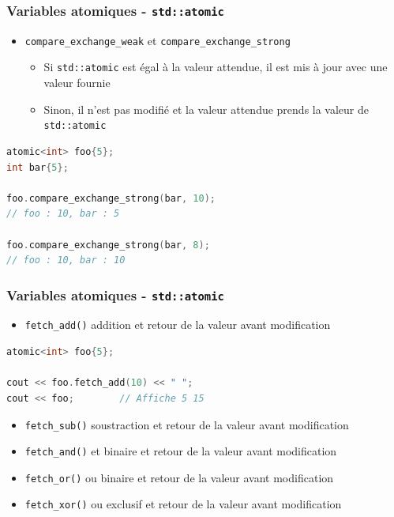 \documentclass[C++.tex]{subfiles}
\begin{document}
\begin{frame}[fragile]
	\frametitle{Variables atomiques - \lstinline|std::atomic|}
	\begin{itemize}
		\item \lstinline|compare_exchange_weak| et \lstinline|compare_exchange_strong| 


		\begin{itemize}
			\item Si \lstinline|std::atomic| est égal à la valeur attendue, il est mis à jour avec une valeur fournie
			\item Sinon, il n'est pas modifié et la valeur attendue prends la valeur de \lstinline|std::atomic|
		\end{itemize}
	\end{itemize}

	\begin{lstlisting}[language=C++]
atomic<int> foo{5};
int bar{5};

foo.compare_exchange_strong(bar, 10);
// foo : 10, bar : 5

foo.compare_exchange_strong(bar, 8);
// foo : 10, bar : 10\end{lstlisting}
\end{frame}

\begin{frame}[fragile]
	\frametitle{Variables atomiques - \lstinline|std::atomic|}
	\begin{itemize}
		\item \lstinline|fetch_add()| addition et retour de la valeur avant modification
	\end{itemize}

	\begin{lstlisting}[language=C++]
atomic<int> foo{5};

cout << foo.fetch_add(10) << " ";
cout << foo;        // Affiche 5 15\end{lstlisting}

	\begin{itemize}
		\item \lstinline|fetch_sub()| soustraction et retour de la valeur avant modification
		\item \lstinline|fetch_and()| \og et\fg{} binaire et retour de la valeur avant modification
		\item \lstinline|fetch_or()| \og ou\fg{} binaire et retour de la valeur avant modification
		\item \lstinline|fetch_xor()| \og ou exclusif\fg{} et retour de la valeur avant modification
	\end{itemize}
\end{frame}
\end{document}
